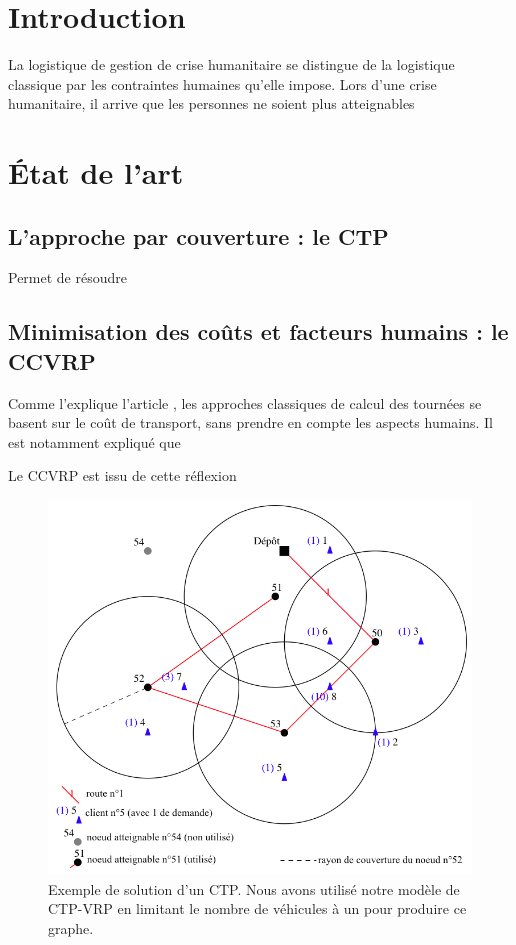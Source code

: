 \documentclass[12pt, a4paper, onecolumn, twoside,french,cleardoublepage=plain,openany]{article}
\begin{document}

\section{Introduction}\label{introduction}
La logistique de gestion de crise humanitaire se distingue de la logistique classique par les contraintes humaines qu'elle impose. 
Lors d'une crise humanitaire, il arrive que les personnes ne soient plus atteignables

\section{État de l'art}
\subsection{L'approche par couverture : le CTP} \label{CTP}
Permet de résoudre 
\subsection{Minimisation des coûts et facteurs humains : le CCVRP} \label{CCVRP}
Comme l'explique l'article \cite{campbell_routing_2008}, les approches classiques de calcul des tournées se basent sur le coût de transport, sans prendre en compte les aspects humains. Il est notamment expliqué que %

Le CCVRP est issu de cette réflexion %


\begin{figure}[!ht] \centering
	\includegraphics[width=0.999\textwidth]{figures/ctp_sans_vrp}
	\caption[Image générée par une corrélation]{Exemple de solution d'un CTP. Nous avons utilisé notre modèle de CTP-VRP en limitant le nombre de véhicules à un pour produire ce graphe.} \label{fig_correlation} 
\end{figure}
\end{document}
